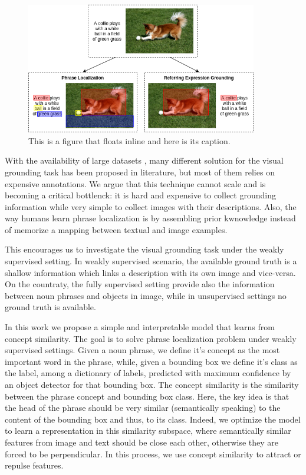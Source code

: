 \begin{figure}
    \centering
    \includegraphics[width=0.9\textwidth]{figures/dog-playing-with-ball.png}
    \caption[Short figure name.]{This is a figure that floats inline and here is its caption. 
    \label{fig:dog-playing-with-ball}}
\end{figure}

With the availability of large datasets ,
many different solution for the visual grounding task has been
proposed in literature, but most of them relies on expensive
annotations. We argue that this technique cannot scale and is becoming
a critical bottlenck: it is hard and expensive to collect grounding
information while very simple to collect images with their
descriptions. Also, the way humans learn phrase localization is by
assembling prior kwnowledge instead of memorize a mapping between
textual and image examples.

This encourages us to investigate the visual grounding task under the
weakly supervised setting. In weakly supervised scenario, the
available ground truth is a shallow information which links a
description with its own image and vice-versa. On the countraty, the
fully supervised setting provide also the information between noun
phrases and objects in image, while in unsupervised settings no ground
truth is available.

In this work we propose a simple and interpretable model that learns
from concept similarity. The goal is to solve phrase localization
problem under weakly supervised settings. Given a noun phrase, we
define it's concept as the most important word in the phrase, while,
given a bounding box we define it's class as the label, among a
dictionary of labels, predicted with maximum confidence by an object
detector for that bounding box. The concept similarity is the
similarity between the phrase concept and bounding box class. Here,
the key idea is that the head of the phrase should be very similar
(semantically speaking) to the content of the bounding box and thus,
to its class. Indeed, we optimize the model to learn a representation
in this similarity subspace, where semantically similar features from
image and text should be close each other, otherwise they are forced
to be perpendicular. In this process, we use concept similarity to
attract or repulse features.

